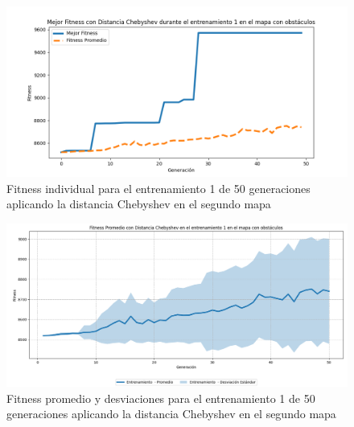 \documentclass[lettersize, journal]{IEEEtran}
\begin{document}
\begin{figure}[H]
    \centering
    \includegraphics[width=0.9 \linewidth]{Chebyshev/Mapa2/Fitness_1_Map2_Cheby_50Gen.png}
    \caption{Fitness individual para el entrenamiento 1 de 50 generaciones aplicando la distancia Chebyshev en el segundo mapa}
    \label{fig:cheb_1_50_m2}
\end{figure}
\begin{figure}[H]
    \centering
    \includegraphics[width=0.9 \linewidth]{Chebyshev/Mapa2/Fitness_1_Map2_Cheby_50Gen_Sombra.png}
    \caption{Fitness promedio y desviaciones para el entrenamiento 1 de 50 generaciones aplicando la distancia Chebyshev en el segundo mapa}
    \label{fig:cheb_1_50_sombra_m2}
\end{figure}
\end{document}
